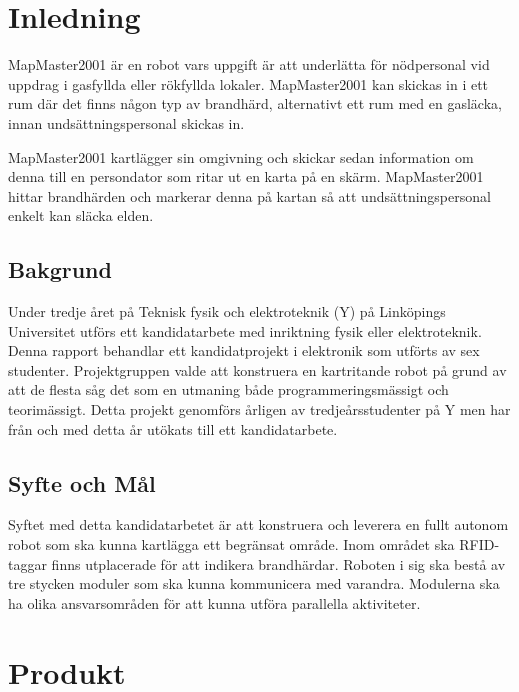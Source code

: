 \documentclass[a4paper,12pt,fleqn]{article}
\begin{document}
\addto\captionsswedish{\renewcommand{\contentsname}{Innehållsförteckning}}

\tableofcontents
\newpage
\listoffigures
\thispagestyle{fancy}
\newpage



\section{Inledning} 
MapMaster2001 är en robot vars uppgift är att underlätta för nödpersonal vid uppdrag i gasfyllda eller rökfyllda lokaler. MapMaster2001 kan skickas in i ett rum där det finns någon typ av brandhärd, alternativt ett rum med en gasläcka, innan undsättningspersonal skickas in. 

MapMaster2001 kartlägger sin omgivning och skickar sedan information om denna till en persondator som ritar ut en karta på en skärm. MapMaster2001 hittar brandhärden och markerar denna på kartan så att undsättningspersonal enkelt kan släcka elden. 

\subsection{Bakgrund}
Under tredje året på Teknisk fysik och elektroteknik (Y) på Linköpings Universitet utförs ett kandidatarbete
med inriktning fysik eller elektroteknik. Denna rapport behandlar ett kandidatprojekt i elektronik som utförts av sex studenter. Projektgruppen valde att konstruera en kartritande robot på grund av att de flesta såg det som en utmaning både programmeringsmässigt och teorimässigt. Detta projekt genomförs årligen av tredjeårsstudenter på Y men har från och med detta år utökats till ett kandidatarbete. 

\subsection{Syfte och Mål}
Syftet med detta kandidatarbetet är att konstruera och leverera en fullt autonom robot som ska kunna kartlägga ett begränsat område. Inom området ska RFID-taggar finns utplacerade för att indikera brandhärdar. Roboten i sig ska bestå av tre stycken moduler som ska kunna kommunicera med varandra. Modulerna ska ha olika ansvarsområden för att kunna utföra parallella aktiviteter. 

\newpage
\section{Produkt}
\end{document}
